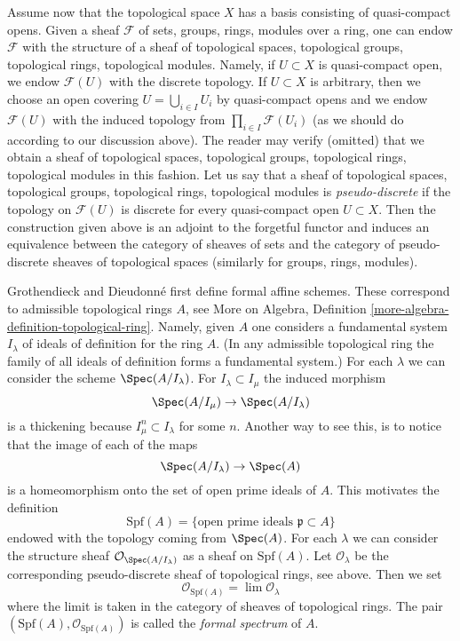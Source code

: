 \medskip\noindent
Assume now that the topological space $X$ has a basis consisting
of quasi-compact opens. Given a sheaf $\mathcal{F}$ of sets, groups,
rings, modules over a ring, one can endow $\mathcal{F}$ with
the structure of a sheaf of topological spaces, topological groups,
topological rings, topological modules.
Namely, if $U \subset X$ is quasi-compact open,
we endow $\mathcal{F}(U)$ with the discrete topology. If $U \subset X$
is arbitrary, then we choose an open covering $U = \bigcup_{i \in I} U_i$
by quasi-compact opens and we endow $\mathcal{F}(U)$ with
the induced topology from $\prod_{i \in I} \mathcal{F}(U_i)$
(as we should do according to our discussion above).
The reader may verify (omitted) that we obtain a sheaf of topological spaces,
topological groups, topological rings, topological modules in this fashion.
Let us say that a sheaf of topological spaces, topological groups,
topological rings, topological modules is
{\it pseudo-discrete} if the topology on $\mathcal{F}(U)$ is
discrete for every quasi-compact open $U \subset X$. Then
the construction given above is an adjoint to the forgetful functor
and induces an equivalence between the category of sheaves
of sets and the category of pseudo-discrete sheaves of topological spaces
(similarly for groups, rings, modules).

\medskip\noindent
Grothendieck and Dieudonn\'e first define formal affine schemes.
These correspond to admissible topological rings $A$, see
More on Algebra, Definition \ref{more-algebra-definition-topological-ring}.
Namely, given $A$ one considers a fundamental system $I_\lambda$ of ideals
of definition for the ring $A$. (In any admissible topological ring
the family of all ideals of definition forms a fundamental system.)
For each $\lambda$ we can consider the
scheme $\Spec(A/I_\lambda)$. For $I_\lambda \subset I_\mu$ the induced
morphism
$$
\Spec(A/I_\mu) \to \Spec(A/I_\lambda)
$$
is a thickening because $I_\mu^n \subset I_\lambda$ for some $n$.
Another way to see this, is to notice that the image of each of the
maps
$$
\Spec(A/I_\lambda) \to \Spec(A)
$$
is a homeomorphism onto the set of open prime ideals of $A$.
This motivates the definition
$$
\text{Spf}(A) = \{\text{open prime ideals }\mathfrak p \subset A\}
$$
endowed with the topology coming from $\Spec(A)$. For each $\lambda$
we can consider the structure sheaf $\mathcal{O}_{\Spec(A/I_\lambda)}$
as a sheaf on $\text{Spf}(A)$. Let $\mathcal{O}_\lambda$ be the corresponding
pseudo-discrete sheaf of topological rings, see above.
Then we set
$$
\mathcal{O}_{\text{Spf}(A)} = \lim \mathcal{O}_\lambda
$$
where the limit is taken in the category of sheaves of topological rings.
The pair $(\text{Spf}(A), \mathcal{O}_{\text{Spf}(A)})$ is called the
{\it formal spectrum} of $A$.

